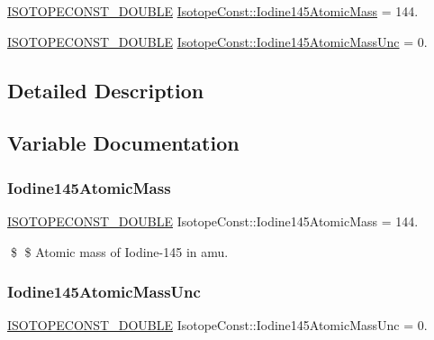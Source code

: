 \begin{DoxyCompactItemize}
\item 
\mbox{\hyperlink{group___isotope_const-_macros_ga8f45a7272ce02c0b4c65c44636ed719a}{I\+S\+O\+T\+O\+P\+E\+C\+O\+N\+S\+T\+\_\+\+D\+O\+U\+B\+LE}} \mbox{\hyperlink{group___isotope_const-_iodine-_i145_gaa70e34b27d78545a27494fcfc4456ab8}{Isotope\+Const\+::\+Iodine145\+Atomic\+Mass}} = 144.
\item 
\mbox{\hyperlink{group___isotope_const-_macros_ga8f45a7272ce02c0b4c65c44636ed719a}{I\+S\+O\+T\+O\+P\+E\+C\+O\+N\+S\+T\+\_\+\+D\+O\+U\+B\+LE}} \mbox{\hyperlink{group___isotope_const-_iodine-_i145_gaf6dd4f2ea68382f300457500ec2dd803}{Isotope\+Const\+::\+Iodine145\+Atomic\+Mass\+Unc}} = 0.
\end{DoxyCompactItemize}


\subsection{Detailed Description}


\subsection{Variable Documentation}
\mbox{\label{group___isotope_const-_iodine-_i145_gaa70e34b27d78545a27494fcfc4456ab8}} 
\subsubsection{\texorpdfstring{Iodine145\+Atomic\+Mass}{Iodine145AtomicMass}}
{\footnotesize\ttfamily \mbox{\hyperlink{group___isotope_const-_macros_ga8f45a7272ce02c0b4c65c44636ed719a}{I\+S\+O\+T\+O\+P\+E\+C\+O\+N\+S\+T\+\_\+\+D\+O\+U\+B\+LE}} Isotope\+Const\+::\+Iodine145\+Atomic\+Mass = 144.}

\$ \$ Atomic mass of Iodine-\/145 in amu. \mbox{\label{group___isotope_const-_iodine-_i145_gaf6dd4f2ea68382f300457500ec2dd803}} 
\subsubsection{\texorpdfstring{Iodine145\+Atomic\+Mass\+Unc}{Iodine145AtomicMassUnc}}
{\footnotesize\ttfamily \mbox{\hyperlink{group___isotope_const-_macros_ga8f45a7272ce02c0b4c65c44636ed719a}{I\+S\+O\+T\+O\+P\+E\+C\+O\+N\+S\+T\+\_\+\+D\+O\+U\+B\+LE}} Isotope\+Const\+::\+Iodine145\+Atomic\+Mass\+Unc = 0.}

